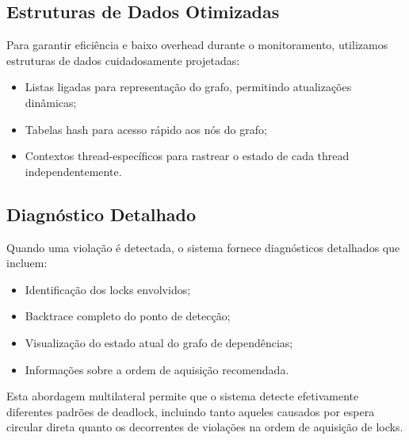 \subsection{Estruturas de Dados Otimizadas}

Para garantir eficiência e baixo overhead durante o monitoramento, utilizamos estruturas de dados cuidadosamente projetadas:

\begin{itemize}
    \item Listas ligadas para representação do grafo, permitindo atualizações dinâmicas;
    \item Tabelas hash para acesso rápido aos nós do grafo;
    \item Contextos thread-específicos para rastrear o estado de cada thread independentemente.
\end{itemize}

\subsection{Diagnóstico Detalhado}

Quando uma violação é detectada, o sistema fornece diagnósticos detalhados que incluem:

\begin{itemize}
    \item Identificação dos locks envolvidos;
    \item Backtrace completo do ponto de detecção;
    \item Visualização do estado atual do grafo de dependências;
    \item Informações sobre a ordem de aquisição recomendada.
\end{itemize}

Esta abordagem multilateral permite que o sistema detecte efetivamente diferentes padrões de deadlock, incluindo tanto aqueles causados por espera circular direta quanto os decorrentes de violações na ordem de aquisição de locks.
